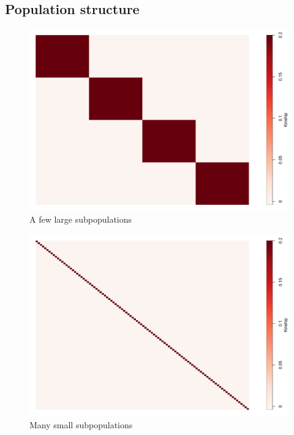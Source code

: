 
\subsection{Population structure}
\begin{figure}[H]
    \centering
    \includegraphics[scale = 0.7]{figures/kinship1}
    \caption{A few large subpopulations}
    \label{fig:big_blocks}
\end{figure}
\begin{figure}[H]
    \centering
    \includegraphics[scale = 0.7]{figures/kinship2}
    \caption{Many small subpopulations}
    \label{fig:small_blocks}
\end{figure}

